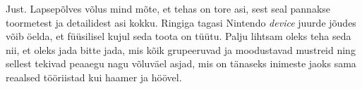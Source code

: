 
Just. Lapsepõlves võlus mind mõte, et tehas on 
tore asi, sest seal pannakse toormetest ja detailidest asi kokku. Ringiga 
tagasi Nintendo \emph{device} 
juurde jõudes võib öelda, et füüsilisel kujul seda toota on tüütu. Palju 
lihtsam oleks teha 
seda nii, et oleks jada bitte jada, mis kõik grupeeruvad ja moodustavad 
mustreid ning sellest tekivad peaaegu nagu võluväel asjad, mis on
tänaseks inimeste jaoks sama reaalsed tööriistad kui haamer ja höövel.
